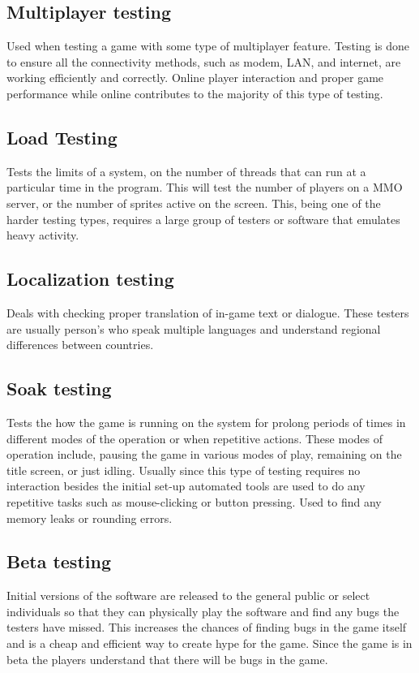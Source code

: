  \subsection{Multiplayer testing} Used when testing a game with some type of multiplayer feature. Testing is done to ensure all the connectivity methods, such as modem, LAN, and internet, are working efficiently and correctly. Online player interaction and proper game performance while online contributes to the majority of this type of testing.

\subsection{Load Testing} Tests the limits of a system, on the number of threads that can run at a particular time in the program. This will test the number of players on a MMO server, or the number of sprites active on the screen. This, being one of the harder testing types, requires a large group of testers or software that emulates heavy activity.

\subsection{Localization testing} Deals with checking proper translation of in-game text or dialogue. These testers are usually person's who speak multiple languages and understand regional differences between countries.

\subsection{Soak testing} Tests the how the game is running on the system for prolong periods of times in different modes of the operation or when repetitive actions. These modes of operation include, pausing the game in various modes of play, remaining on the title screen, or just idling. Usually since this type of testing requires no interaction besides the initial set-up automated tools are used to do any repetitive tasks such as mouse-clicking or button pressing. Used to find any memory leaks or rounding errors.

\subsection{Beta testing} Initial versions of the software are released to the general public or select individuals so that they can physically play the software and find any bugs the testers have missed. This increases the chances of finding bugs in the game itself and is a cheap and efficient way to create hype for the game. Since the game is in beta the players understand that there will be bugs in the game.

